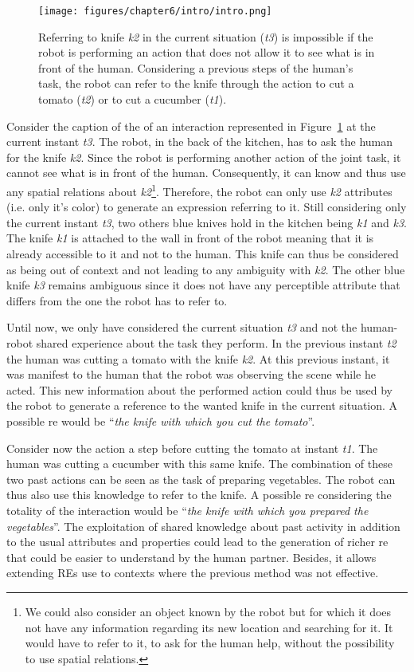\begin{figure}[ht!]
\centering
\texttt{[image: figures/chapter6/intro/intro.png]}
\caption{\label{fig:chap6_intro} Referring to knife \textit{k2} in the current situation (\textit{t3}) is impossible if the robot is performing an action that does not allow it to see what is in front of the human. Considering a previous steps of the human's task, the robot can refer to the knife through the action to cut a tomato (\textit{t2}) or to cut a cucumber (\textit{t1}).}
\end{figure}

Consider the caption of the of an interaction represented in Figure~\ref{fig:chap6_intro} at the current instant \textit{t3}. The robot, in the back of the kitchen, has to ask the human for the knife \textit{k2}. Since the robot is performing another action of the joint task, it cannot see what is in front of the human. Consequently, it can know and thus use any spatial relations about \textit{k2}\footnote{We could also consider an object known by the robot but for which it does not have any information regarding its new location and searching for it. It would have to refer to it, to ask for the human help, without the possibility to use spatial relations.}. Therefore, the robot can only use \textit{k2} attributes (i.e. only it's color) to generate an expression referring to it. Still considering only the current instant \textit{t3}, two others blue knives hold in the kitchen being \textit{k1} and \textit{k3}. The knife \textit{k1} is attached to the wall in front of the robot meaning that it is already accessible to it and not to the human. This knife can thus be considered as being out of context and not leading to any ambiguity with \textit{k2}. The other blue knife \textit{k3} remains ambiguous since it does not have any perceptible attribute that differs from the one the robot has to refer to.

Until now, we only have considered the current situation \textit{t3} and not the human-robot shared experience about the task they perform. In the previous instant \textit{t2} the human was cutting a tomato with the knife \textit{k2}. At this previous instant, it was manifest to the human that the robot was observing the scene while he acted. This new information about the performed action could thus be used by the robot to generate a reference to the wanted knife in the current situation. A possible \acrshort{re} would be ``\textit{the knife with which you cut the tomato}''. 

Consider now the action a step before cutting the tomato at instant \textit{t1}. The human was cutting a cucumber with this same knife. The combination of these two past actions can be seen as the task of preparing vegetables. The robot can thus also use this knowledge to refer to the knife. A possible \acrshort{re} considering the totality of the interaction would be ``\textit{the knife with which you prepared the vegetables}''. The exploitation of shared knowledge about past activity in addition to the usual attributes and properties could lead to the generation of richer \acrshort{re} that could be easier to understand by the human partner. Besides, it allows extending REs use to contexts where the previous method was not effective.

